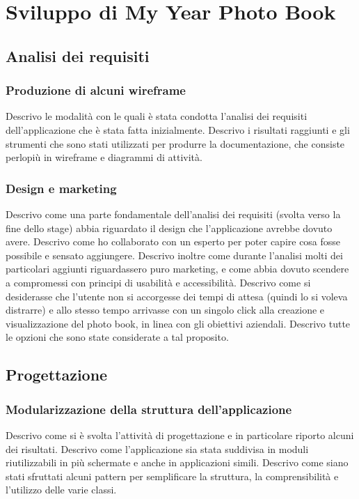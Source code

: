 	\section{Sviluppo di My Year Photo Book}
		\subsection{Analisi dei requisiti}
			\subsubsection{Produzione di alcuni wireframe}
				Descrivo le modalità con le quali è stata condotta l'analisi dei requisiti dell'applicazione che è stata fatta
				inizialmente. Descrivo i risultati raggiunti e gli strumenti che sono stati utilizzati per produrre la
				documentazione, che consiste perlopiù in wireframe e diagrammi di attività.
			\subsubsection{Design e marketing}
				Descrivo come una parte fondamentale dell'analisi dei requisiti (svolta verso la fine dello stage) abbia riguardato
				il design che l'applicazione avrebbe dovuto avere. Descrivo come ho collaborato con un esperto per poter capire
				cosa fosse possibile e sensato aggiungere. Descrivo inoltre come durante l'analisi molti dei particolari aggiunti
				riguardassero puro marketing, e come abbia dovuto scendere a compromessi con principi di usabilità e accessibilità.
				Descrivo come si desiderasse che l'utente non si accorgesse dei tempi di attesa (quindi lo si voleva distrarre) e
				allo stesso tempo arrivasse con un singolo click alla creazione e visualizzazione del photo book, in linea con
				gli obiettivi aziendali. Descrivo tutte le opzioni che sono state considerate a tal proposito.
		\subsection{Progettazione}
			\subsubsection{Modularizzazione della struttura dell'applicazione}
				Descrivo come si è svolta l'attività di progettazione e in particolare riporto alcuni dei risultati. Descrivo come
				l'applicazione sia stata suddivisa in moduli riutilizzabili in più schermate e anche in applicazioni simili. 
				Descrivo come siano stati sfruttati alcuni pattern per semplificare la struttura, la comprensibilità e l'utilizzo
				delle varie classi.
